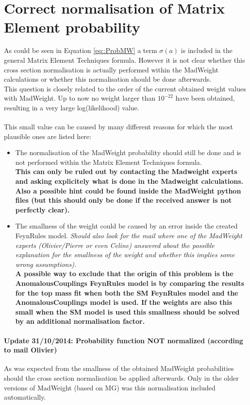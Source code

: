 \section{Correct normalisation of Matrix Element probability}
As could be seen in Equation \ref{eq::ProbMW} a term $\sigma(a)$ is included in the general Matrix Element Techniques formula. However it is not clear whether this cross section normalisation is actually performed within the MadWeight calculations or whether this normalisation should be done afterwards.\\
This question is closely related to the order of the current obtained weight values with MadWeight. Up to now no weight larger than $10^{-22}$ have been obtained, resulting in a very large log(likelihood) value. \\
\\
This small value can be caused by many different reasons for which the most plausible ones are listed here:
\begin{itemize}
 \item The normalisation of the MadWeight probability should still be done and is not performed within the Matrix Element Techniques formula.\\ \textbf{This can only be ruled out by contacting the Madweight experts and asking explicitely what is done in the Madweight calculations. Also a possible hint could be found inside the MadWeight python files (but this should only be done if the received answer is not perfectly clear).}
 \item The smallness of the weight could be caused by an error inside the created FeynRules model. \textit{Should also look for the mail where one of the MadWeight experts (Olivier/Pierre or even Celine) answered about the possible explanation for the smallness of the weight and whether this implies some wrong assumptions).}\\ \textbf{A possible way to exclude that the origin of this problem is the AnomalousCouplings FeynRules model is by comparing the results for the top mass fit when both the SM FeynRules model and the AnomalousCouplings model is used. If the weights are also this small when the SM model is used this smallness should be solved by an additional normalisation factor.}
\end{itemize}

\paragraph{Update 31/10/2014: Probability function NOT normalized (according to mail Olivier)\\}
As was expected from the smallness of the obtained MadWeight probabilities should the cross section normalisation be applied afterwards. Only in the older versions of MadWeight (based on MG) was this normalisation included automatically.

